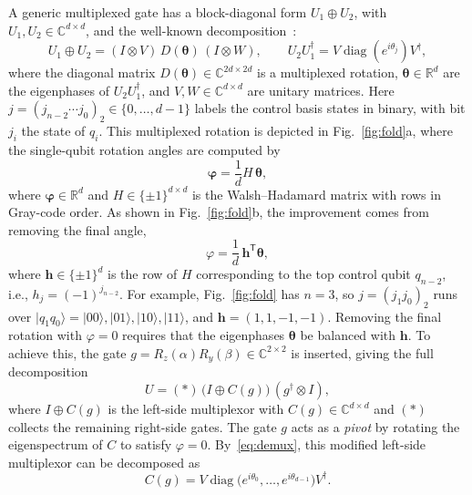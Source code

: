 \documentclass[11pt]{article}
\begin{document}
A generic multiplexed gate has a block-diagonal form $U_1\oplus U_2$, with $U_1,U_2\in\mathbb C^{d\times d}$, and the well-known decomposition~\cite{smb}:
\begin{equation}\label{eq:demux}
U_1\oplus U_2=(I\otimes V)\,D(\boldsymbol\theta)\,(I\otimes W),\qquad
U_2U_1^\dagger=V\operatorname{diag}(e^{i\theta_j})V^\dagger ,
\end{equation}
where the diagonal matrix $D(\boldsymbol\theta)\in\mathbb C^{2d\times 2d}$ is a multiplexed rotation, $\boldsymbol\theta\in\mathbb R^d$ are the eigenphases of $U_2U_1^\dagger$, and $V,W\in\mathbb C^{d\times d}$ are unitary matrices. Here $j=(j_{n-2}\cdots j_0)_2\in\{0,\dots,d-1\}$ labels the control basis states in binary, with bit $j_i$ the state of $q_i$. This multiplexed rotation is depicted in Fig.~\ref{fig:fold}a, where the single-qubit rotation angles are computed by~\cite{mottonen}
\begin{equation}\label{eq:walsh}
\boldsymbol\varphi=\frac1d H\,\boldsymbol\theta,
\end{equation}
where $\boldsymbol\varphi\in\mathbb R^d$ and $H\in\{\pm1\}^{d\times d}$ is the Walsh--Hadamard matrix with rows in Gray-code order. As shown in Fig.~\ref{fig:fold}b, the improvement comes from removing the final angle,
\begin{equation}\label{eq:phi}
\varphi=\frac1d\,\mathbf h^{\mathsf T}\boldsymbol\theta,
\end{equation}
where $\mathbf h\in\{\pm1\}^d$ is the row of $H$ corresponding to the top control qubit $q_{n-2}$, i.e., $h_j=(-1)^{j_{n-2}}$. 
For example, Fig.~\ref{fig:fold} has $n=3$, so $j=(j_1j_0)_2$ runs over $\lvert q_1q_0\rangle=\lvert00\rangle,\lvert01\rangle,\lvert10\rangle,\lvert11\rangle$, and $\mathbf h=(1,1,-1,-1)$. Removing the final rotation with $\varphi=0$ requires that the eigenphases $\boldsymbol\theta$ be balanced with $\mathbf h$. To achieve this, the gate $g=R_z(\alpha)R_y(\beta)\in\mathbb C^{2\times 2}$ is inserted, giving the full decomposition
\begin{equation}\label{eq:zxz}
U=(\ast)\,\big(I\oplus C(g)\big)\,(g^\dagger\otimes I),
\end{equation}
where $I\oplus C(g)$ is the left-side multiplexor with $C(g)\in\mathbb C^{d\times d}$ and $(\ast)$ collects the remaining right-side
gates. The gate $g$ acts as a \emph{pivot} by rotating the eigenspectrum of $C$ to satisfy $\varphi=0$. By~\eqref{eq:demux}, this modified left-side multiplexor can be decomposed as
\begin{equation}\label{eq:democ}
C(g)=V\operatorname{diag}\big(e^{i\theta_0},\dots,e^{i\theta_{d-1}}\big)V^\dagger .
\end{equation}
\end{document}

